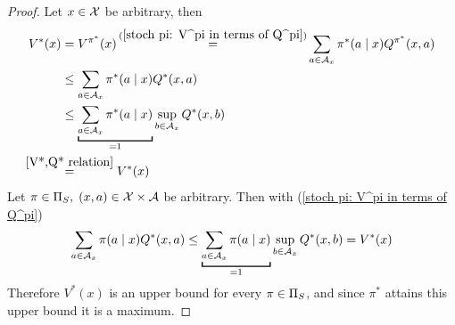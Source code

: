 \begin{proof}
	\xToy{\ref{ii:1}}{\ref{ii:2}} Let \(x\in\mathcal{X}\) be arbitrary, then
	\begin{align*}
		V^*(x)&=V^{\pi^*}(x)\xeq{(\ref{stoch pi: V^pi in terms of Q^pi})}
		\sum_{a\in\cA_x}\pi^*(a\mid x) Q^{\pi^*}(x,a) \nonumber\\
		&\le \sum_{a\in\cA_x}\pi^*(a\mid x) Q^*(x,a)\\
		&\le \underbracket[1pt]{\sum_{a\in\cA_x}\pi^*(a\mid x)}_{=1} 
		\sup_{b\in\cA_x}Q^*(x,b) \nonumber\\
		&\lxeq{\ref{V*,Q* relation}}V^*(x) \nonumber
	\end{align*}
	\xToy{\ref{ii:2}}{\ref{ii:3}} Let \(\pi\in\Pi_S,\; (x,a)\in\mathcal{X}\times\mathcal{A}\) be arbitrary. Then with (\ref{stoch pi: V^pi in terms of Q^pi})
	\[
		\sum_{a\in\cA_x}\pi(a\mid x) Q^*(x,a)
		\le \underbracket[1pt]{\sum_{a\in\cA_x}\pi(a\mid x)}_{=1}
		\sup_{b\in\cA_x}Q^*(x,b)=V^*(x)
	\]
	Therefore \(V^* (x)\) is an upper bound for every \(\pi\in\Pi_S\), and since \(\pi^*\) attains this upper bound it is a maximum.


\end{proof}

